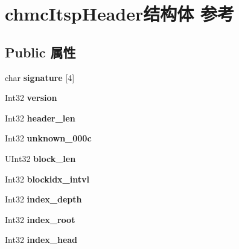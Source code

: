 \hypertarget{structchmc_itsp_header}{}\section{chmc\+Itsp\+Header结构体 参考}
\label{structchmc_itsp_header}
\subsection*{Public 属性}
\begin{DoxyCompactItemize}
\item 
\mbox{\label{structchmc_itsp_header_a1a12cdfc79c53d3255d78b81910b2368}} 
char {\bfseries signature} \mbox{[}4\mbox{]}
\item 
\mbox{\label{structchmc_itsp_header_a696858d562b36b06944ab990b8bc13ee}} 
Int32 {\bfseries version}
\item 
\mbox{\label{structchmc_itsp_header_ad6d4b1c93bce879357410de53285f0a3}} 
Int32 {\bfseries header\+\_\+len}
\item 
\mbox{\label{structchmc_itsp_header_a9eeda024d4df6468680643deab99c84e}} 
Int32 {\bfseries unknown\+\_\+000c}
\item 
\mbox{\label{structchmc_itsp_header_a2c30088e089d20767c31fded706b8626}} 
U\+Int32 {\bfseries block\+\_\+len}
\item 
\mbox{\label{structchmc_itsp_header_af7b81df0dbd250a36d22c85b28a43062}} 
Int32 {\bfseries blockidx\+\_\+intvl}
\item 
\mbox{\label{structchmc_itsp_header_a6e130ae1bb810cf62cdcb789d456df66}} 
Int32 {\bfseries index\+\_\+depth}
\item 
\mbox{\label{structchmc_itsp_header_abae1827dc97463e32717f60281f09fe3}} 
Int32 {\bfseries index\+\_\+root}
\item 
\mbox{\label{structchmc_itsp_header_a3bf858edb7f00d0213c6214642517104}} 
Int32 {\bfseries index\+\_\+head}
\item 

\end{DoxyCompactItemize}
